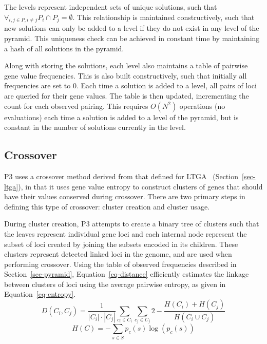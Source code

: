 \documentclass{sig-alternate}
\begin{document}
The levels represent independent sets of unique solutions, such that
$\forall_{i, j \in P, i \neq j} P_i \cap P_j = \emptyset$.  This relationship
is maintained constructively, such that new solutions can only be added to a level
if they do not exist in any level of the pyramid.  This uniqueness check can be
achieved in constant time by maintaining a hash of all solutions in the pyramid.

Along with storing the solutions, each level also maintains a table of pairwise
gene value frequencies.  This is also built constructively, such that initially
all frequencies are set to 0.  Each time a solution is added to a level, all
pairs of loci are queried for their gene values.  The table is then updated,
incrementing the count for each observed pairing.  This requires $O(N^2)$ operations
(no evaluations) each time a solution is added to a level of the pyramid, but is
constant in the number of solutions currently in the level.

\subsection{Crossover}
\label{sec-crossover}
P3 uses a crossover method derived from that defined for LTGA~\cite{thierens:2013:ltgahiff}
(Section~\ref{sec-ltga}),
in that it uses gene value entropy to construct clusters of genes that should have their values
conserved during crossover.  There are two primary steps in
defining this type of crossover: cluster creation and cluster usage.

During cluster creation, P3 attempts to create a binary tree of clusters such that the leaves
represent individual gene loci and each internal node represent the subset of loci created
by joining the subsets encoded in its children.  These clusters represent detected linked
loci in the genome, and are used when performing crossover.
Using the table of observed frequencies described in Section~\ref{sec-pyramid}, Equation~\ref{eq-distance}
efficiently estimates the linkage between clusters of loci using the average pairwise
entropy, as given in Equation~\ref{eq-entropy}.
\begin{equation}
  D(C_i,C_j) = \frac{1}{\left | C_i \right |\cdot \left |C_j \right|}\sum_{c_i \in C_i}\sum_{c_j \in C_j} 
  2 - \frac{H(C_i) + H(C_j)}{H(C_i \cup C_j)}
  \label{eq-distance}
\end{equation}
\begin{equation}
  H(C) = -\sum_{s\in S} p_c(s)\log(p_c(s))
  \label{eq-entropy}
\end{equation}
\end{document}
